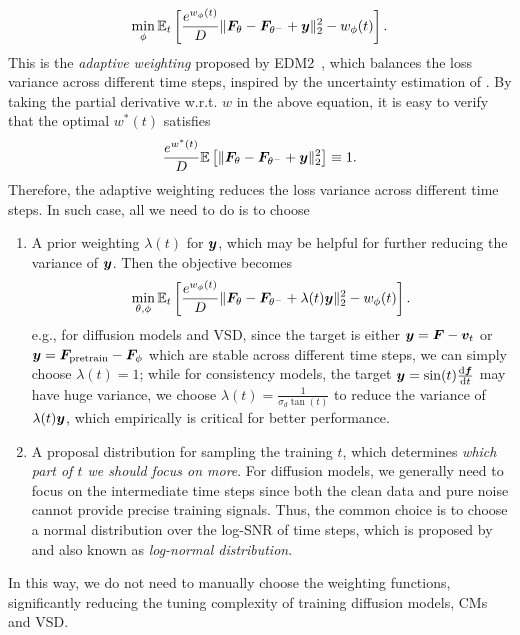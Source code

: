 \[
\min_\phi \mathbb{E}_t \left[
    \frac{e^{w_\phi(t)}}{D}\|{\bm{F}}_\theta - {\bm{F}}_{\theta^-} + {\bm{y}}\|_2^2 - w_\phi(t)
\right].
\]
This is the \textit{adaptive weighting} proposed by EDM2~\citep{karras2024edm2}, which balances the loss variance across different time steps, inspired by the uncertainty estimation of \citet{sener2018multi}. By taking the partial derivative w.r.t. $w$ in the above equation, it is easy to verify that the optimal $w^*(t)$ satisfies
\[
    \frac{e^{w^*(t)}}{D}\mathbb{E}\left[\|{\bm{F}}_\theta - {\bm{F}}_{\theta^-} + {\bm{y}}\|_2^2\right] \equiv 1.
\]
Therefore, the adaptive weighting reduces the loss variance across different time steps. In such case, all we need to do is to choose
\begin{enumerate}
    \item A prior weighting $\lambda(t)$ for ${\bm{y}}$, which may be helpful for further reducing the variance of ${\bm{y}}$. Then the objective becomes
    \[
        \min_{\theta,\phi} \mathbb{E}_t \left[
        \frac{e^{w_\phi(t)}}{D}\|{\bm{F}}_\theta - {\bm{F}}_{\theta^-} + \lambda(t){\bm{y}}\|_2^2 - w_\phi(t)
    \right].
    \]
    e.g., for diffusion models and VSD, since the target is either ${\bm{y}} = {\bm{F}}-{\bm{v}}_t$ or ${\bm{y}} = {\bm{F}}_{\text{pretrain}}-{\bm{F}}_\phi$ which are stable across different time steps, we can simply choose $\lambda(t) = 1$; while for consistency models, the target ${\bm{y}} = \sin(t)\frac{\mathrm{d}{\bm{f}}}{\mathrm{d} t}$ may have huge variance, we choose $\lambda(t)=\frac{1}{\sigma_d\tan(t)}$ to reduce the variance of $\lambda(t){\bm{y}}$, which empirically is critical for better performance.
    \item A proposal distribution for sampling the training $t$, which determines \textit{which part of $t$ we should focus on more}. For diffusion models, we generally need to focus on the intermediate time steps since both the clean data and pure noise cannot provide precise training signals. Thus, the common choice is to choose a normal distribution over the log-SNR of time steps, which is proposed by \citet{karras2022edm} and also known as \textit{log-normal distribution}.
\end{enumerate}

In this way, we do not need to manually choose the weighting functions, significantly reducing the tuning complexity of training diffusion models, CMs and VSD.
